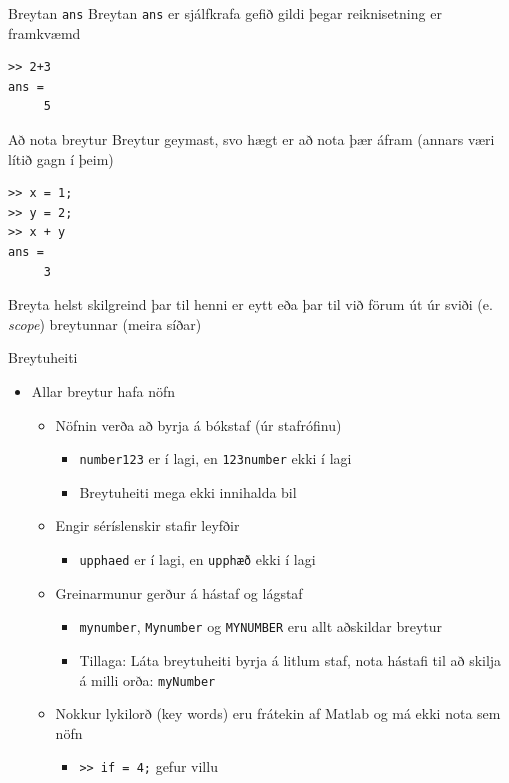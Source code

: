 \documentclass{beamer}
\begin{document}
\begin{frame}[fragile]{Breytan \texttt{ans}}
Breytan \texttt{ans} er sjálfkrafa gefið gildi þegar reiknisetning er framkvæmd 
\begin{verbatim}
>> 2+3
ans = 
     5
\end{verbatim}
\end{frame}

\begin{frame}[fragile]{Að nota breytur}
Breytur geymast, svo hægt er að nota þær áfram (annars væri lítið gagn í þeim)
\begin{verbatim}
>> x = 1;
>> y = 2;
>> x + y
ans =
     3
\end{verbatim}
Breyta helst skilgreind þar til henni er eytt eða þar til við förum út úr sviði (e. \emph{scope}) breytunnar (meira síðar)
\end{frame}

\begin{frame}{Breytuheiti}
\begin{itemize}
 \item Allar breytur hafa nöfn
 \begin{itemize}
  \item Nöfnin verða að byrja á bókstaf (úr stafrófinu)
  \begin{itemize}
   \item \texttt{number123} er í lagi, en  \texttt{123number}  ekki í lagi
   \item Breytuheiti mega ekki innihalda bil
  \end{itemize}
  \item Engir séríslenskir stafir leyfðir
  \begin{itemize}
   \item \texttt{upphaed}  er í lagi, en  \texttt{upphæð}  ekki í lagi
  \end{itemize}
  \item Greinarmunur gerður á hástaf og lágstaf
  \begin{itemize}
   \item \texttt{mynumber}, \texttt{Mynumber} og \texttt{MYNUMBER} eru allt aðskildar breytur
   \item Tillaga: Láta breytuheiti byrja á litlum staf, nota hástafi til að skilja á milli orða: \texttt{myNumber}
  \end{itemize}
  \item Nokkur lykilorð (key words) eru frátekin af Matlab og má ekki nota sem nöfn
  \begin{itemize}
   \item \texttt{>> if = 4;}    gefur villu
  \end{itemize}
 \end{itemize}
\end{itemize}
\end{frame}
\end{document}
